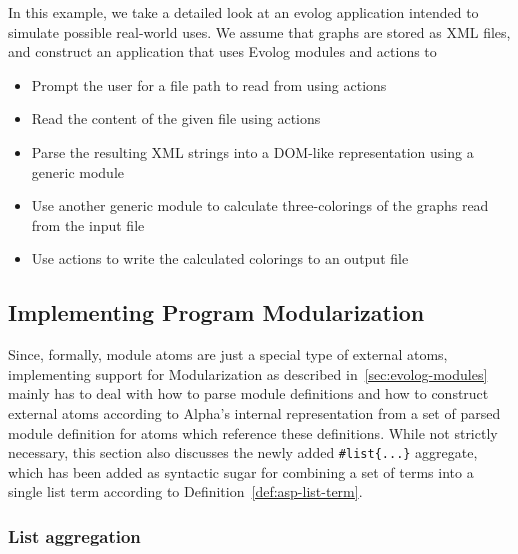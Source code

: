 
\begin{example}
In this example, we take a detailed look at an evolog application intended to simulate possible real-world uses. We assume that graphs are stored as XML files, and construct an application that uses Evolog modules and actions to
\begin{itemize}
    \item Prompt the user for a file path to read from using actions
    \item Read the content of the given file using actions
    \item Parse the resulting XML strings into a DOM-like representation using a generic module
    \item Use another generic module to calculate three-colorings of the graphs read from the input file
    \item Use actions to write the calculated colorings to an output file
\end{itemize}        
\label{ex:implementation-actions-program-with-guesses}
\end{example}    

\subsection{Implementing Program Modularization}

Since, formally, module atoms are just a special type of external atoms, implementing support for Modularization as described in~\ref{sec:evolog-modules} mainly has to deal with how to parse module definitions and how to construct external atoms according to Alpha's internal representation from a set of parsed module definition for atoms which reference these definitions. While not strictly necessary, this section also discusses the newly added \texttt{\#list\{...\}} aggregate, which has been added as syntactic sugar for combining a set of terms into a single list term according to Definition~\ref{def:asp-list-term}.

\subsubsection{List aggregation}

